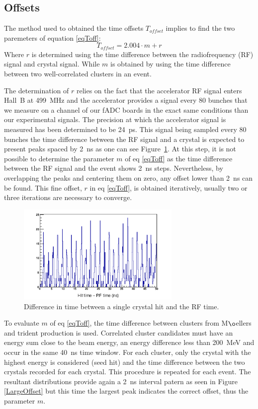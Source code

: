 \documentclass[review]{elsarticle}
\begin{document}
\subsection{Offsets}
The method used to obtained the time offsets $T_{offset}$ implies to find the two paremeters of equation \ref{eqToff}:
\begin{equation}
T_{offset} = 2.004 \cdot m + r
\label{eqToff}
\end{equation}
Where $r$ is determined using the time difference between the radiofrequency (RF)
signal and crystal signal. While $m$ is obtained by using the time difference between two well-correlated clusters in an event. 

The determination of $r$ relies on the fact that the accelerator RF signal enters
Hall~B at 499~MHz and the accelerator provides a signal every 80 bunches that we
measure on a channel of our fADC boards in the exact same conditions than
our experimental signals. The precision at which the accelerator signal is 
measured has been determined to be 24~ps. This signal being sampled every 80 
bunches the time difference between the RF signal and a crystal is expected 
to present peaks spaced by 2~ns as one can see Figure~\ref{RF}. At this step, it is
not possible to determine the parameter $m$ of eq \ref{eqToff} as the time difference
between the RF signal and the event shows 2~ns steps. Nevertheless, by overlapping the peaks and centering them on zero, any offset lower than 2~ns can be found. This fine
offset, $r$ in eq \ref{eqToff}, is obtained iteratively, usually two or three iterations are necessary to converge.


\begin{figure}[ht!]
\centering
\includegraphics[width=0.70\textwidth]{crystalSpectra.png}
\caption{Difference in time between a single crystal hit and the RF time.}
\label{RF}
\end{figure}

To evaluate $m$ of eq \ref{eqToff}, the time difference between 
clusters from M$\o$ellers and trident production is used. 
Correlated cluster candidates must have an energy sum close to the beam energy, 
an energy difference less than 200~MeV and occur in the same 40~ns time window.
For each cluster, only the crystal with the highest energy is considered (seed hit) and the time difference between the two crystals recorded for each crystal. 
This procedure is repeated for each event. The resultant distributions provide 
again a 2~ns interval patern as seen in Figure \ref{LargeOffset} but this time
the largest peak indicates the correct offset, thus the parameter $m$.
\end{document}
